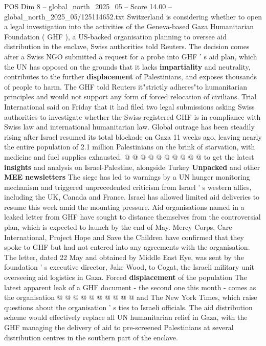 \begin{textsample}{POS Dim 8 – global\_north\_2025\_05 – Score 14.00 – global\_north\_2025\_05/125114652.txt}  \label{ex:f8_pos_031}
Switzerland is considering whether to open a legal investigation into the activities of the Geneva-based Gaza Humanitarian Foundation ( GHF ), a US-backed organisation planning to oversee aid distribution in the enclave, Swiss authorities told Reuters.
The decision comes after a Swiss NGO submitted a request for a probe into GHF ' s aid plan, which the UN has opposed on the grounds that it lacks \textbf{impartiality} and neutrality, contributes to the further \textbf{displacement} of Palestinians, and exposes thousands of people to harm.
The GHF told Reuters it"strictly adheres"to humanitarian principles and would not support any form of forced relocation of civilians.
Trial International said on Friday that it had filed two legal submissions asking Swiss authorities to investigate whether the Swiss-registered GHF is in compliance with Swiss law and international humanitarian law.
Global outrage has been steadily rising after Israel resumed its total blockade on Gaza 11 weeks ago, leaving nearly the entire population of 2.1 million Palestinians on the brink of starvation, with medicine and fuel supplies exhausted. @ @ @ @ @ @ @ @ @ @ to get the latest \textbf{insights} and analysis on Israel-Palestine, alongside Turkey \textbf{Unpacked} and other \textbf{MEE} \textbf{newsletters} The siege has led to warnings by a UN hunger monitoring mechanism and triggered unprecedented criticism from Israel ' s western allies, including the UK, Canada and France.
Israel has allowed limited aid deliveries to resume this week amid the mounting pressure.
Aid organisations named in a leaked letter from GHF have sought to distance themselves from the controversial plan, which is expected to launch by the end of May.
Mercy Corps, Care International, Project Hope and Save the Children have confirmed that they spoke to GHF but had not entered into any agreements with the organisation.
The letter, dated 22 May and obtained by Middle East Eye, was sent by the foundation ' s executive director, Jake Wood, to Cogat, the Israeli military unit overseeing aid logistics in Gaza.
Forced \textbf{displacement} of the population The latest apparent leak of a GHF document - the second one this month - comes as the organisation @ @ @ @ @ @ @ @ @ @ and The New York Times, which raise questions about the organisation ' s ties to Israeli officials.
The aid distribution scheme would effectively replace all UN humanitarian relief in Gaza, with the GHF managing the delivery of aid to pre-screened Palestinians at several distribution centres in the southern part of the enclave.

\end{textsample}
